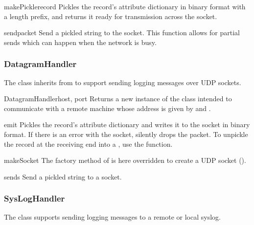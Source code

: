 \begin{methoddesc}{makePickle}{record}
Pickles the record's attribute dictionary in binary format with a length
prefix, and returns it ready for transmission across the socket.
\end{methoddesc}

\begin{methoddesc}{send}{packet}
Send a pickled string  to the socket. This function allows
for partial sends which can happen when the network is busy.
\end{methoddesc}

\subsubsection{DatagramHandler}

The  class inherits from 
to support sending logging messages over UDP sockets.

\begin{classdesc}{DatagramHandler}{host, port}
Returns a new instance of the  class intended to
communicate with a remote machine whose address is given by 
and .
\end{classdesc}

\begin{methoddesc}{emit}{}
Pickles the record's attribute dictionary and writes it to the socket in
binary format. If there is an error with the socket, silently drops the
packet.
To unpickle the record at the receiving end into a , use the
 function.
\end{methoddesc}

\begin{methoddesc}{makeSocket}{}
The factory method of  is here overridden to create
a UDP socket ().
\end{methoddesc}

\begin{methoddesc}{send}{s}
Send a pickled string to a socket.
\end{methoddesc}

\subsubsection{SysLogHandler}

The  class supports sending logging messages to a
remote or local \UNIX{} syslog.

